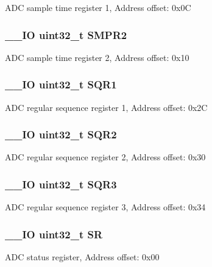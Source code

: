 A\-D\-C sample time register 1, Address offset\-: 0x0\-C \hypertarget{struct_a_d_c___type_def_a6ac83fae8377c7b7fcae50fa4211b0e8}{
\subsubsection[{S\-M\-P\-R2}]{\setlength{\rightskip}{0pt plus 5cm}\-\_\-\-\_\-\-I\-O uint32\-\_\-t S\-M\-P\-R2}}\label{struct_a_d_c___type_def_a6ac83fae8377c7b7fcae50fa4211b0e8}
A\-D\-C sample time register 2, Address offset\-: 0x10 \hypertarget{struct_a_d_c___type_def_a3302e1bcfdfbbfeb58779d0761fb377c}{
\subsubsection[{S\-Q\-R1}]{\setlength{\rightskip}{0pt plus 5cm}\-\_\-\-\_\-\-I\-O uint32\-\_\-t S\-Q\-R1}}\label{struct_a_d_c___type_def_a3302e1bcfdfbbfeb58779d0761fb377c}
A\-D\-C regular sequence register 1, Address offset\-: 0x2\-C \hypertarget{struct_a_d_c___type_def_aab440b0ad8631f5666dd32768a89cf60}{
\subsubsection[{S\-Q\-R2}]{\setlength{\rightskip}{0pt plus 5cm}\-\_\-\-\_\-\-I\-O uint32\-\_\-t S\-Q\-R2}}\label{struct_a_d_c___type_def_aab440b0ad8631f5666dd32768a89cf60}
A\-D\-C regular sequence register 2, Address offset\-: 0x30 \hypertarget{struct_a_d_c___type_def_a97e40d9928fa25a5628d6442f0aa6c0f}{
\subsubsection[{S\-Q\-R3}]{\setlength{\rightskip}{0pt plus 5cm}\-\_\-\-\_\-\-I\-O uint32\-\_\-t S\-Q\-R3}}\label{struct_a_d_c___type_def_a97e40d9928fa25a5628d6442f0aa6c0f}
A\-D\-C regular sequence register 3, Address offset\-: 0x34 \hypertarget{struct_a_d_c___type_def_af6aca2bbd40c0fb6df7c3aebe224a360}{
\subsubsection[{S\-R}]{\setlength{\rightskip}{0pt plus 5cm}\-\_\-\-\_\-\-I\-O uint32\-\_\-t S\-R}}\label{struct_a_d_c___type_def_af6aca2bbd40c0fb6df7c3aebe224a360}
A\-D\-C status register, Address offset\-: 0x00 

